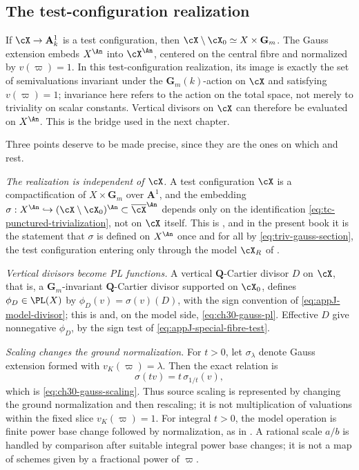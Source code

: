 \subsection{The test-configuration realization}
\label{sec:ch32-gauss-tc}

If $\cX\to\mathbf A^1_k$ is a test configuration, then
$\cX\setminus\cX_0\simeq X\times\mathbf G_m$.  The Gauss extension embeds
$X^{\An}$ into $\cX^{\An}$, centered on the central fibre and normalized
by $v(\varpi)=1$.  In this test-configuration realization, its image is
exactly the set of semivaluations invariant under the
$\mathbf G_m(k)$-action on $\cX$ and satisfying $v(\varpi)=1$;
invariance here refers to the action on the total space, not merely to
triviality on scalar constants.  Vertical divisors on $\cX$ can therefore
be evaluated on $X^{\An}$.  This is the bridge used in the next chapter.

Three points deserve to be made precise, since they are the ones on which
 and  rest.

\emph{The realization is independent of $\cX$.}  A test configuration
$\cX$ is a compactification of $X\times\mathbf G_m$ over
$\mathbf A^1$, and the embedding
$\sigma:X^{\An}\hookrightarrow(\cX\setminus\cX_0)^{\An}
\subset\overline{\cX}^{\An}$ depends only on the identification
\eqref{eq:tc-punctured-trivialization}, not on $\cX$ itself.  This is
\cite[Remark~1.9]{BJ22}, and in the present book it is the statement that
$\sigma$ is defined on $X^{\An}$ once and for all by
\eqref{eq:triv-gauss-section}, the test configuration entering only through
the model $\cX_R$ of .

\emph{Vertical divisors become PL functions.}  A vertical
$\mathbf Q$-Cartier divisor $D$ on $\cX$, that is, a
$\mathbf G_m$-invariant $\mathbf Q$-Cartier divisor supported on
$\cX_0$, defines $\phi_D\in\PL(X)$ by $\phi_D(v)=\sigma(v)(D)$, with
the sign convention of \eqref{eq:appJ-model-divisor}; this is
 and, on the model side,
\eqref{eq:ch30-gauss-pl}.  Effective $D$ give nonnegative
$\phi_D$, by the sign test of \eqref{eq:appJ-special-fibre-test}.

\emph{Scaling changes the ground normalization.}  For $t>0$, let
$\sigma_\lambda$ denote Gauss extension formed with
$v_K(\varpi)=\lambda$.  Then the exact relation is
\[
                    \sigma(tv)=t\,\sigma_{1/t}(v),
\]
which is \eqref{eq:ch30-gauss-scaling}.  Thus source scaling is represented
by changing the ground normalization and then rescaling; it is not
multiplication of valuations within the fixed slice $v_K(\varpi)=1$.  For integral $t>0$, the model operation is finite power base change
followed by normalization, as in .
A rational scale $a/b$ is handled by comparison after suitable integral
power base changes; it is not a map of schemes given by a fractional power
of $\varpi$.

